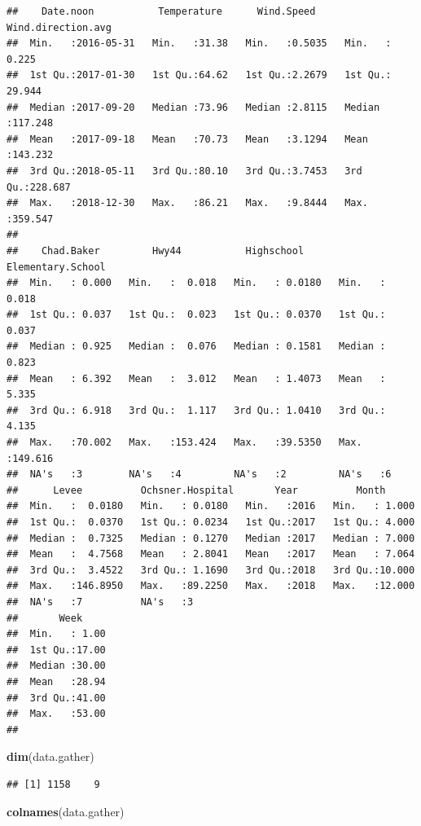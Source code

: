 \documentclass[12pt,]{article}
\newenvironment{Shaded}{\begin{snugshade}}{\end{snugshade}}
\newcommand{\KeywordTok}[1]{\textcolor[rgb]{0.13,0.29,0.53}{\textbf{#1}}}
\newcommand{\NormalTok}[1]{#1}
\begin{document}
\begin{verbatim}
##    Date.noon           Temperature      Wind.Speed     Wind.direction.avg
##  Min.   :2016-05-31   Min.   :31.38   Min.   :0.5035   Min.   :  0.225   
##  1st Qu.:2017-01-30   1st Qu.:64.62   1st Qu.:2.2679   1st Qu.: 29.944   
##  Median :2017-09-20   Median :73.96   Median :2.8115   Median :117.248   
##  Mean   :2017-09-18   Mean   :70.73   Mean   :3.1294   Mean   :143.232   
##  3rd Qu.:2018-05-11   3rd Qu.:80.10   3rd Qu.:3.7453   3rd Qu.:228.687   
##  Max.   :2018-12-30   Max.   :86.21   Max.   :9.8444   Max.   :359.547   
##                                                                          
##    Chad.Baker         Hwy44           Highschool      Elementary.School
##  Min.   : 0.000   Min.   :  0.018   Min.   : 0.0180   Min.   :  0.018  
##  1st Qu.: 0.037   1st Qu.:  0.023   1st Qu.: 0.0370   1st Qu.:  0.037  
##  Median : 0.925   Median :  0.076   Median : 0.1581   Median :  0.823  
##  Mean   : 6.392   Mean   :  3.012   Mean   : 1.4073   Mean   :  5.335  
##  3rd Qu.: 6.918   3rd Qu.:  1.117   3rd Qu.: 1.0410   3rd Qu.:  4.135  
##  Max.   :70.002   Max.   :153.424   Max.   :39.5350   Max.   :149.616  
##  NA's   :3        NA's   :4         NA's   :2         NA's   :6        
##      Levee          Ochsner.Hospital       Year          Month       
##  Min.   :  0.0180   Min.   : 0.0180   Min.   :2016   Min.   : 1.000  
##  1st Qu.:  0.0370   1st Qu.: 0.0234   1st Qu.:2017   1st Qu.: 4.000  
##  Median :  0.7325   Median : 0.1270   Median :2017   Median : 7.000  
##  Mean   :  4.7568   Mean   : 2.8041   Mean   :2017   Mean   : 7.064  
##  3rd Qu.:  3.4522   3rd Qu.: 1.1690   3rd Qu.:2018   3rd Qu.:10.000  
##  Max.   :146.8950   Max.   :89.2250   Max.   :2018   Max.   :12.000  
##  NA's   :7          NA's   :3                                        
##       Week      
##  Min.   : 1.00  
##  1st Qu.:17.00  
##  Median :30.00  
##  Mean   :28.94  
##  3rd Qu.:41.00  
##  Max.   :53.00  
## 
\end{verbatim}

\begin{Shaded}
\begin{Highlighting}[]
\KeywordTok{dim}\NormalTok{(data.gather)}
\end{Highlighting}
\end{Shaded}

\begin{verbatim}
## [1] 1158    9
\end{verbatim}

\begin{Shaded}
\begin{Highlighting}[]
\KeywordTok{colnames}\NormalTok{(data.gather)}
\end{Highlighting}
\end{Shaded}
\end{document}
